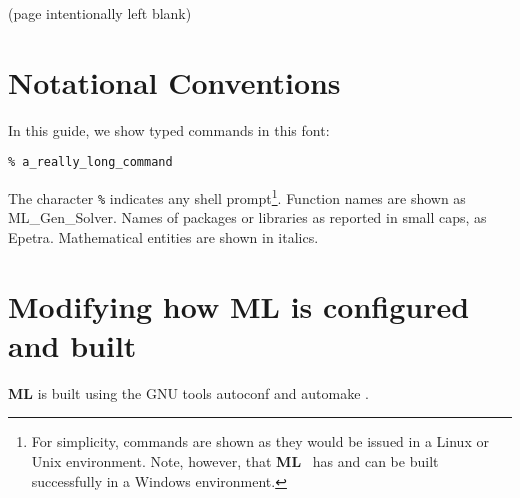 \documentclass{article}[12pt]
\newcommand{\ML}     {{\bf ML }}
\begin{document}
\begin{abstract}

This guide is intended for anyone who will be adding to or modifying the \ML
source code.  This document contains suggested practices, naming conventions,
and autoconf/automake hints.  We don't intend for this document to be a set
of hard-and-fast rules, but rather {\em suggested} and {\em encouraged}
practices.

\ML\ is a multigrid preconditioning package intended to solve linear systems
 of equations $A x = b$ where $A$ is a user supplied $n \times n$ sparse
matrix, $b$ is a user supplied vector of length $n$ and $x$ is a vector of
length $n$ to be computed. \ML\ should be used on large sparse linear
systems arising from partial differential equation (PDE) discretizations.
For an overview of ML, we refer to the ML users' guide.
\end{abstract}

%
\clearpage
\newpage

\vfill
\begin{center}
(page intentionally left blank)
\end{center}
\clearpage
\newpage


\tableofcontents
\newpage
%
%
\section{Notational Conventions}
%

In this guide, we show typed commands in this font:
\begin{verbatim}
% a_really_long_command
\end{verbatim}
The character \verb!%! indicates any shell prompt\footnote{For
  simplicity, commands are shown as they would be issued in a Linux or
  Unix environment.  Note, however, that \ML\ has and can be built
  successfully in a Windows environment.}.
Function names are shown as {\sf ML\_Gen\_Solver}.  Names of packages or
libraries as reported in small caps, as {\sc Epetra}. Mathematical
entities are shown in italics.


\section{Modifying how \ML is configured and built}

\ML is built using the GNU tools autoconf and automake \cite{Autoconf,Automake}.
\end{document}
